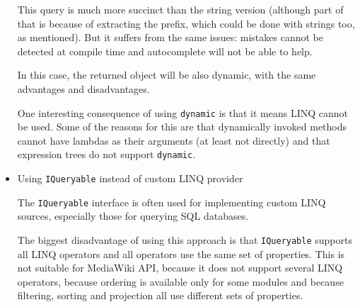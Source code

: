 \begin{itemize}
This query is much more succinct than the string version
(although part of that is because of extracting the prefix,
which could be done with strings too, as mentioned).
But it suffers from the same issues: mistakes cannot be detected at compile time
and autocomplete will not be able to help.

In this case, the returned object will be also dynamic,
with the same advantages and disadvantages.

One interesting consequence of using \lstinline{dynamic} is that it means LINQ cannot be used.
Some of the reasons for this are that dynamically invoked methods cannot have lambdas as their arguments
(at least not directly) and that expression trees do not support \lstinline{dynamic}.

\item Using \lstinline{IQueryable} instead of custom LINQ provider

The \lstinline{IQueryable} interface is often used for implementing custom \ac{LINQ} sources,
especially those for querying \ac{SQL} databases.

The biggest disadvantage of using this approach is that \lstinline{IQueryable}
supports all LINQ operators and all operators use the same set of properties.
This is not suitable for MediaWiki \ac{API},
because it does not support several LINQ operators,
because ordering is available only for some modules
and because filtering, sorting and projection all use different sets of properties.

\end{itemize}